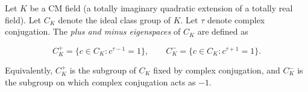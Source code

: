 Let $K$ be a CM field (a totally imaginary quadratic extension of a totally real field). Let $C_K$ denote the ideal class group of $K$. Let $\tau$ denote complex conjugation. The \emph{plus and minus eigenspaces} of $C_K$ are defined as

$$
C_K^+ = \{ c \in C_K : c^{\tau - 1} = 1 \}, \qquad
C_K^- = \{ c \in C_K : c^{\tau + 1} = 1 \}.
$$

Equivalently, $C_K^+$ is the subgroup of $C_K$ fixed by complex conjugation, and $C_K^-$ is the subgroup on which complex conjugation acts as $-1$.
